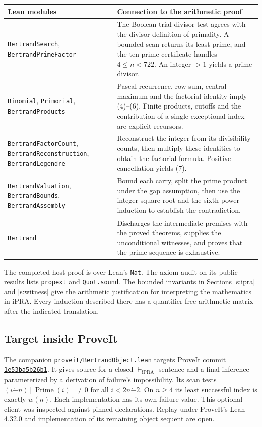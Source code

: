 \documentclass[12pt,letterpaper]{article}
\newcommand{\Prime}{\operatorname{Prime}}
\newcommand{\w}{w}
\newcommand{\dotminus}{\mathbin{\dot{-}}}
\newcommand{\code}[1]{\texttt{\small #1}}
\begin{document}
\smallskip
\begin{tabularx}{\linewidth}{@{}>{\raggedright\arraybackslash}p{.33\linewidth} X@{}}
\toprule
\textsf{Lean modules} & \textsf{Connection to the arithmetic proof}\\ \midrule
\code{BertrandSearch}, \code{BertrandPrimeFactor} & The Boolean trial-divisor test agrees with the divisor definition of primality. A bounded scan returns its least prime, and the ten-prime certificate handles \(4\le n<722\). An integer \(>1\) yields a prime divisor.\\[2pt]
\code{Binomial}, \code{Primorial}, \code{BertrandProducts} & Pascal recurrence, row sum, central maximum and the factorial identity imply (4)--(6). Finite products, cutoffs and the contribution of a single exceptional index are explicit recursors.\\[2pt]
\code{BertrandFactorCount}, \code{BertrandReconstruction}, \code{BertrandLegendre} & Reconstruct the integer from its divisibility counts, then multiply these identities to obtain the factorial formula. Positive cancellation yields (7).\\[2pt]
\code{BertrandValuation}, \code{BertrandBounds}, \code{BertrandAssembly} & Bound each carry, split the prime product under the gap assumption, then use the integer square root and the sixth-power induction to establish the contradiction.\\[2pt]
\code{Bertrand} & Discharges the intermediate premises with the proved theorems, supplies the unconditional witnesses, and proves that the prime sequence is exhaustive.\\
\bottomrule
\end{tabularx}

The completed host proof is over Lean's \code{Nat}. The axiom audit on its public results lists \code{propext} and \code{Quot.sound}. The bounded invariants in Sections \ref{s:ipra} and \ref{s:witness} give the arithmetic justification for interpreting the mathematics in iPRA. Every induction described there has a quantifier-free arithmetic matrix after the indicated translation.

\subsection*{Target inside ProveIt}
The companion \code{proveit/BertrandObject.lean} targets ProveIt commit \href{https://github.com/VladimirReshetnikov/ProveIt/commit/1e53ba5b26b144afb01bf6774d75cf35f6c760b2}{\code{1e53ba5b26b1}}. It gives source for a closed \(\vdash_{\mathrm{iPRA}}\)-sentence and a final inference parameterized by a derivation of failure's impossibility. Its scan tests \((i\dotminus n)[\Prime(i)]\ne0\) for all \(i<2n\dotminus2\). On \(n\ge4\) its least successful index is exactly \(\w(n)\). Each implementation has its own failure value. This optional client was inspected against pinned declarations. Replay under ProveIt's Lean 4.32.0 and implementation of its remaining object sequent are open.
\end{document}
